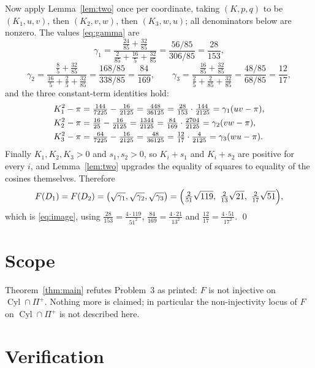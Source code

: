 \documentclass[11pt]{amsart}
\theoremstyle{remark}
\DeclareMathOperator{\Cyl}{Cyl}
\begin{document}
Now apply Lemma~\ref{lem:two} once per coordinate, taking $(K,p,q)$ to be $(K_1,u,v)$, then
$(K_2,v,w)$, then $(K_3,w,u)$; all denominators below are nonzero. The values
\eqref{eq:gamma} are
\[
 \gamma_1=\frac{\tfrac{24}{85}+\tfrac{32}{85}}{\tfrac{2}{85}+\tfrac{16}{5}+\tfrac{32}{85}}
 =\frac{56/85}{306/85}=\frac{28}{153},
\]
\[
 \gamma_2=\frac{\tfrac85+\tfrac{32}{85}}{\tfrac{16}{5}+\tfrac25+\tfrac{32}{85}}
 =\frac{168/85}{338/85}=\frac{84}{169},
 \qquad
 \gamma_3=\frac{\tfrac{16}{85}+\tfrac{32}{85}}{\tfrac25+\tfrac{2}{85}+\tfrac{32}{85}}
 =\frac{48/85}{68/85}=\frac{12}{17},
\]
and the three constant-term identities hold:
\begin{align}
 K_1^{2}-\pi&=\tfrac{144}{7225}-\tfrac{16}{2125}=\tfrac{448}{36125}
   =\tfrac{28}{153}\cdot\tfrac{144}{2125}=\gamma_1(uv-\pi),\notag\\
 K_2^{2}-\pi&=\tfrac{16}{25}-\tfrac{16}{2125}=\tfrac{1344}{2125}
   =\tfrac{84}{169}\cdot\tfrac{2704}{2125}=\gamma_2(vw-\pi),\label{eq:three}\\
 K_3^{2}-\pi&=\tfrac{64}{7225}-\tfrac{16}{2125}=\tfrac{48}{36125}
   =\tfrac{12}{17}\cdot\tfrac{4}{2125}=\gamma_3(wu-\pi).\notag
\end{align}
Finally $K_1,K_2,K_3>0$ and $s_1,s_2>0$, so $K_i+s_1$ and $K_i+s_2$ are positive for every
$i$, and Lemma~\ref{lem:two} upgrades the equality of squares to equality of the cosines
themselves. Therefore
\[
 F(D_1)=F(D_2)=\bigl(\sqrt{\gamma_1},\sqrt{\gamma_2},\sqrt{\gamma_3}\bigr)
 =\Bigl(\tfrac{2}{51}\sqrt{119},\ \tfrac{2}{13}\sqrt{21},\ \tfrac{2}{17}\sqrt{51}\Bigr),
\]
which is \eqref{eq:image}, using $\tfrac{28}{153}=\tfrac{4\cdot119}{51^{2}}$,
$\tfrac{84}{169}=\tfrac{4\cdot21}{13^{2}}$ and
$\tfrac{12}{17}=\tfrac{4\cdot51}{17^{2}}$. \qed

\section{Scope}\label{sec:scope}

Theorem~\ref{thm:main} refutes Problem~3 as printed: $F$ is not injective on
$\Cyl\cap\Pi^{+}$. Nothing more is claimed; in particular the non-injectivity locus of $F$
on $\Cyl\cap\Pi^{+}$ is not described here.

\section{Verification}
\end{document}
